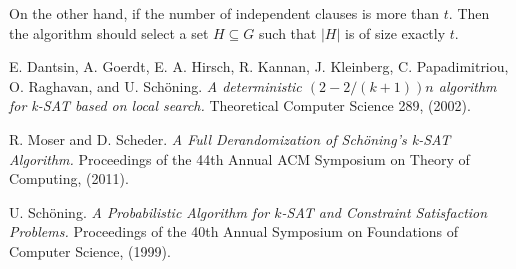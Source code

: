 \documentclass[a4paper,12pts]{article}
\begin{document}
On the other hand, if the number of independent clauses is more than $t$. Then the algorithm should select a set $H \subseteq G$ such that $|H|$ is of size exactly $t$. 

\begin{thebibliography}{9}
E. Dantsin, A. Goerdt, E. A. Hirsch, R. Kannan, J. Kleinberg, C. Papadimitriou, O. Raghavan, and U. Sch\"{o}ning. 
\textit{A deterministic $(2-2/(k+1))n$ algorithm for k-SAT based on local search.} Theoretical Computer Science 289, (2002).

R. Moser and D. Scheder.
\textit{A Full Derandomization of Sch\"{o}ning’s k-SAT Algorithm.} Proceedings of the 44th Annual ACM Symposium on Theory of Computing, (2011).

U. Sch\"{o}ning.
\textit{A Probabilistic Algorithm for $k$-SAT and Constraint Satisfaction Problems.} Proceedings of the 40th Annual Symposium on Foundations of Computer Science, (1999).

\end{thebibliography}
\end{document}
